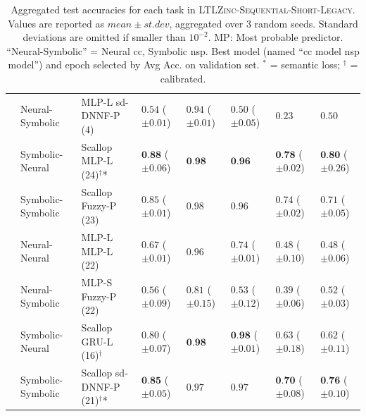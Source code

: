 \begin{table}
{\begin{tabular}{clllllll}
			& Neural-Symbolic & MLP-L sd-DNNF-P (4) & $0.54 $ {\tiny ($\pm 0.01$)} & $0.94 $ {\tiny ($\pm 0.01$)} & $0.50 $ {\tiny ($\pm 0.05$)} & $0.23$ & $0.50$\\
			& Symbolic-Neural & Scallop MLP-L (24)$^\dag$* & $\textbf{0.88} $ {\tiny ($\pm 0.06$)} & $\textbf{0.98}$ & $\textbf{0.96}$ & $\textbf{0.78} $ {\tiny ($\pm 0.02$)} & $\textbf{0.80} $ {\tiny ($\pm 0.26$)}\\
			& Symbolic-Symbolic & Scallop Fuzzy-P (23) & $0.85 $ {\tiny ($\pm 0.01$)} & $0.98$ & $0.96$ & $0.74 $ {\tiny ($\pm 0.02$)} & $0.71 $ {\tiny ($\pm 0.05$)}\\
			\hdashline
			\multirow{4}{*}{\shortstack[c]{Task 6}} & Neural-Neural & MLP-L MLP-L (22) & $0.67 $ {\tiny ($\pm 0.01$)} & $0.96$ & $0.74 $ {\tiny ($\pm 0.01$)} & $0.48 $ {\tiny ($\pm 0.10$)} & $0.48 $ {\tiny ($\pm 0.06$)}\\
			& Neural-Symbolic & MLP-S Fuzzy-P (22) & $0.56 $ {\tiny ($\pm 0.09$)} & $0.81 $ {\tiny ($\pm 0.15$)} & $0.53 $ {\tiny ($\pm 0.12$)} & $0.39 $ {\tiny ($\pm 0.06$)} & $0.52 $ {\tiny ($\pm 0.03$)}\\
			& Symbolic-Neural & Scallop GRU-L (16)$^\dag$ & $0.80 $ {\tiny ($\pm 0.07$)} & $\textbf{0.98}$ & $\textbf{0.98} $ {\tiny ($\pm 0.01$)} & $0.63 $ {\tiny ($\pm 0.18$)} & $0.62 $ {\tiny ($\pm 0.11$)}\\
			& Symbolic-Symbolic & Scallop sd-DNNF-P (21)$^\dag$* & $\textbf{0.85} $ {\tiny ($\pm 0.05$)} & $0.97$ & $0.97$ & $\textbf{0.70} $ {\tiny ($\pm 0.08$)} & $\textbf{0.76} $ {\tiny ($\pm 0.10$)}\\
			
			\bottomrule
		\end{tabular}
	}
	\caption[Test set accuracies on \textsc{LTLZinc-Sequential-Short-Legacy}]{Aggregated test accuracies for each task in \textsc{LTLZinc-Sequential-Short-Legacy}. Values are reported as $mean \pm st. dev$, aggregated over 3 random seeds. Standard deviations are omitted if smaller than $10^{-2}$. MP: Most probable predictor.
	``Neural-Symbolic'' = Neural {\sc cc}, Symbolic {\sc nsp}. Best model (named ``{\sc cc} model {\sc nsp} model'') and epoch selected by Avg Acc. on validation set. $^{*}$ = semantic loss; $^{\dag}$ = calibrated.}
	\label{ijcai:tab:main}
\end{table}

